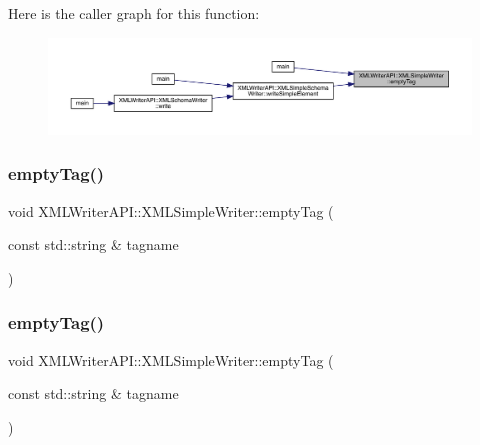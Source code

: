 Here is the caller graph for this function\+:
\nopagebreak
\begin{figure}[H]
\begin{center}
\leavevmode
\includegraphics[width=350pt]{d5/de1/classXMLWriterAPI_1_1XMLSimpleWriter_ae40f02c969275fdde51866d8e9271717_icgraph}
\end{center}
\end{figure}
\mbox{\label{classXMLWriterAPI_1_1XMLSimpleWriter_ae75e5988a4d97721ee9be5c7a18abfc4}} 
\subsubsection{\texorpdfstring{emptyTag()}{emptyTag()}\hspace{0.1cm}{\footnotesize\ttfamily [2/12]}}
{\footnotesize\ttfamily void X\+M\+L\+Writer\+A\+P\+I\+::\+X\+M\+L\+Simple\+Writer\+::empty\+Tag (\begin{DoxyParamCaption}\item[{const std\+::string \&}]{tagname }\end{DoxyParamCaption})}

\mbox{\label{classXMLWriterAPI_1_1XMLSimpleWriter_ae75e5988a4d97721ee9be5c7a18abfc4}} 
\subsubsection{\texorpdfstring{emptyTag()}{emptyTag()}\hspace{0.1cm}{\footnotesize\ttfamily [3/12]}}
{\footnotesize\ttfamily void X\+M\+L\+Writer\+A\+P\+I\+::\+X\+M\+L\+Simple\+Writer\+::empty\+Tag (\begin{DoxyParamCaption}\item[{const std\+::string \&}]{tagname }\end{DoxyParamCaption})}

